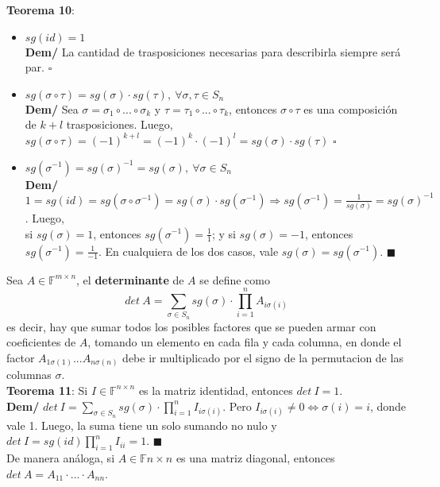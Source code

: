 \documentclass[11pt,a4paper]{article}
\newcommand*{\QEDA}{\null\nobreak\hfill\ensuremath{\blacksquare}}
\newcommand*{\QEDB}{\null\nobreak\hfill\ensuremath{\square}}
\begin{document}
\textbf{Teorema 10}:
\begin{itemize}
\itemsep-0.3em
\item $sg(id) = 1$\\
\textbf{Dem/} La cantidad de trasposiciones necesarias para describirla siempre ser\'a par. \QEDB
\item $sg(\sigma \circ \tau) = sg(\sigma) \cdot sg(\tau),\ \forall \sigma, \tau \in S_n$\\
\textbf{Dem/} Sea $\sigma = \sigma_1 \circ ... \circ \sigma_k$ y $\tau = \tau_1 \circ ... \circ \tau_k$, entonces $\sigma \circ \tau$ es una composici\'on de $k + l$ trasposiciones. Luego, $sg(\sigma \circ \tau) = (-1)^{k + l} = (-1)^k \cdot (-1)^l = sg(\sigma) \cdot sg(\tau)$ \QEDB
\item $sg(\sigma^{-1}) = sg(\sigma)^{-1} = sg(\sigma),\ \forall \sigma \in S_n$\\
\textbf{Dem/} $1 = sg(id) = sg(\sigma \circ \sigma^{-1}) = sg(\sigma) \cdot sg(\sigma^{-1}) \Rightarrow sg(\sigma^{-1}) = \frac{1}{sg(\sigma)} = sg(\sigma)^{-1}$. Luego, \\ si $sg(\sigma) = 1$, entonces $sg(\sigma^{-1}) = \frac{1}{1}$; y si $sg(\sigma) = -1$, entonces  $sg(\sigma^{-1}) = \frac{1}{-1}$. En cualquiera de los dos casos, vale $sg(\sigma) = sg(\sigma^{-1})$. \QEDA\\
\end{itemize}

Sea $A \in \mathbb{F}^{m \times n}$, el \textbf{determinante} de $A$ se define como $$det\ A = \sum_{\sigma \in S_n} sg(\sigma) \cdot \prod_{i=1}^n A_{i\sigma(i)}$$ es decir, hay que sumar todos los posibles factores que se pueden armar con coeficientes de $A$, tomando un elemento en cada fila y cada columna, en donde el factor $A_{1\sigma(1)}...A_{n\sigma(n)}$ debe ir multiplicado por el signo de la permutacion de las columnas $\sigma$.\\

\textbf{Teorema 11}:
Si $I \in \mathbb{F}^{n \times n}$ es la matriz identidad, entonces $det\ I = 1$.\\
\textbf{Dem/} $det\ I = \sum_{\sigma \in S_n} sg(\sigma) \cdot \prod_{i=1}^n I_{i\sigma(i)}$. Pero $I_{i\sigma(i)} \not = 0 \Leftrightarrow \sigma(i) = i$, donde vale 1. Luego, la suma tiene un solo sumando no nulo y $det\ I = sg(id) \prod_{i=1}^n I_{ii} = 1$. \QEDA\\
De manera an\'aloga, si $A \in \mathbb{F}{n \times n}$ es una matriz diagonal, entonces $det\ A = A_{11}\cdot...\cdot A_{nn}$.\\
\end{document}
